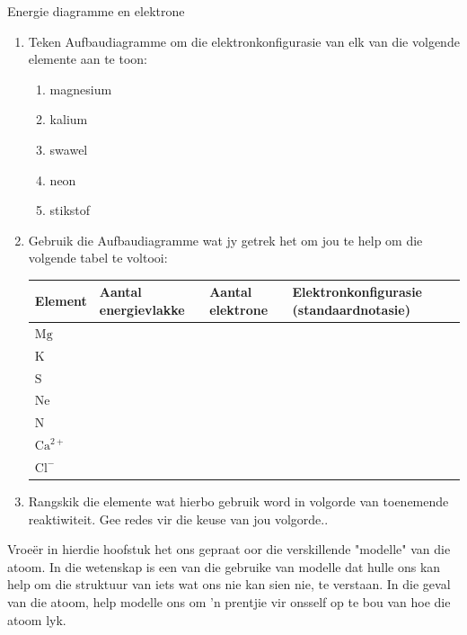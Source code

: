 \begin{exercises}{Energie diagramme en elektrone}
{
\nopagebreak
\begin{enumerate}[noitemsep, label=\textbf{\arabic*}. ] 
\item Teken Aufbaudiagramme om die elektronkonfigurasie van elk van die volgende elemente aan te toon:
\begin{enumerate}[noitemsep, label=\textbf{\alph*}. ] 
\item magnesium
\item kalium
\item swawel
\item neon
\item stikstof
\end{enumerate}
\item Gebruik die Aufbaudiagramme wat jy getrek het om jou te help om die volgende tabel te voltooi:
\begin{center}
\begin{tabular}{|p{1.6cm}|p{2.6cm}|p{2.6cm}|p{2.6cm}|}\hline
\textbf{Element} & \textbf{Aantal energievlakke} & \textbf{Aantal elektrone}  & \textbf{Elektronkonfigurasie (standaardnotasie)}\\\hline
$\text{Mg}$ & &  & \\\hline
$\text{K}$ & &  & \\\hline
$\text{S}$ & & & \\\hline
$\text{Ne}$ &  & & \\\hline
$\text{N}$ & & & \\\hline
$\text{Ca}^{2+}$ & & & \\\hline
$\text{Cl}^{-}$ & & & \\\hline
\end{tabular}
\end{center}    

\item Rangskik die elemente wat hierbo gebruik word in volgorde van toenemende reaktiwiteit. Gee redes vir die keuse van jou volgorde..
\end{enumerate}

}
\end{exercises}            

Vroe\"{e}r in hierdie hoofstuk het ons gepraat oor die verskillende "modelle" van die atoom. In die wetenskap is een van die gebruike van modelle dat hulle ons kan help om die struktuur van iets wat ons nie kan sien nie, te verstaan. In die geval van die atoom, help modelle ons om 'n prentjie vir onsself op te bou van hoe die atoom lyk.\par 

